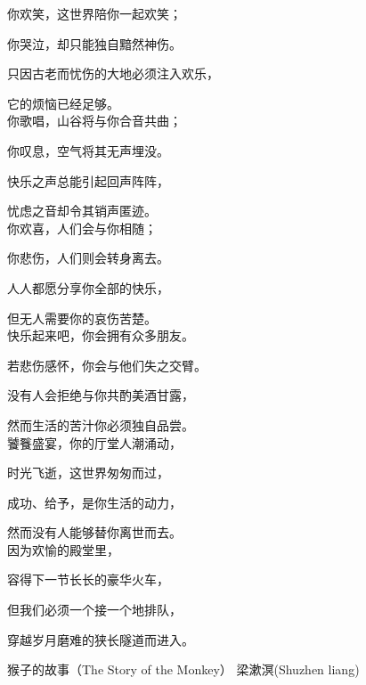 {你欢笑，这世界陪你一起欢笑；
	
	你哭泣，却只能独自黯然神伤。
	
	只因古老而忧伤的大地必须注入欢乐，
	
	它的烦恼已经足够。\\
	
	
	你歌唱，山谷将与你合音共曲；
	
	你叹息，空气将其无声埋没。
	
	快乐之声总能引起回声阵阵，
	
	忧虑之音却令其销声匿迹。\\
	
	
	你欢喜，人们会与你相随；
	
	你悲伤，人们则会转身离去。
	
	人人都愿分享你全部的快乐，
	
	但无人需要你的哀伤苦楚。\\
	
	
	快乐起来吧，你会拥有众多朋友。
	
	若悲伤感怀，你会与他们失之交臂。
	
	没有人会拒绝与你共酌美酒甘露，
	
	然而生活的苦汁你必须独自品尝。\\
	
	
	饕餮盛宴，你的厅堂人潮涌动，
	
	时光飞逝，这世界匆匆而过，
	
	成功、给予，是你生活的动力，
	
	然而没有人能够替你离世而去。\\
	
	
	因为欢愉的殿堂里，
	
	容得下一节长长的豪华火车，
	
	但我们必须一个接一个地排队，
	
	穿越岁月磨难的狭长隧道而进入。}
\words
{	猴子的故事（The Story of the Monkey）}
{梁漱溟(Shuzhen liang)}
